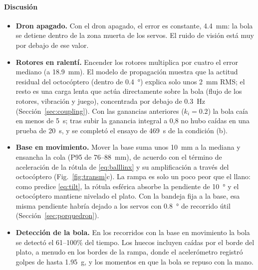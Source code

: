 \paragraph{Discusión}
\begin{itemize}
  \item \textbf{Dron apagado.} Con el dron apagado, el error es constante, \SI{4.4}{\milli\metre}: la bola se detiene dentro de la zona muerta de los servos. El ruido de visión está muy por debajo de ese valor.
  \item \textbf{Rotores en ralentí.} Encender los rotores multiplica por cuatro el error mediano (a \SI{18.9}{\milli\metre}). El modelo de propagación muestra que la actitud residual del octocóptero (dentro de \SI{0.4}{\degree}) explica solo unos \SI{2}{\milli\metre} RMS; el resto es una carga lenta que actúa directamente sobre la bola (flujo de los rotores, vibración y juego), concentrada por debajo de \SI{0.3}{\hertz} (Sección~\ref{sec:coupling}). Con las ganancias anteriores ($k_i=0.2$) la bola caía en menos de \SI{5}{\second}; tras subir la ganancia integral a 0,8 no hubo caídas en una prueba de \SI{20}{\second}, y se completó el ensayo de \SI{469}{\second} de la condición (b).
  \item \textbf{Base en movimiento.} Mover la base suma unos \SI{10}{\milli\metre} a la mediana y ensancha la cola (P95 de 76--\SI{88}{\milli\metre}), de acuerdo con el término de aceleración de la rótula de \eqref{eq:balllinx} y su amplificación a través del octocóptero (Fig.~\ref{fig:transm}c). La rampa es solo un poco peor que el llano: como predice \eqref{eq:tilt}, la rótula esférica absorbe la pendiente de \SI{10}{\degree} y el octocóptero mantiene nivelado el plato. Con la bandeja fija a la base, esa misma pendiente habría dejado a los servos con \SI{0.8}{\degree} de recorrido útil (Sección~\ref{sec:porquedron}).
  \item \textbf{Detección de la bola.} En los recorridos con la base en movimiento la bola se detectó el 61--100\% del tiempo. Los huecos incluyen caídas por el borde del plato, a menudo en los bordes de la rampa, donde el acelerómetro registró golpes de hasta \SI{1.95}{g}, y los momentos en que la bola se repuso con la mano.
\end{itemize}

